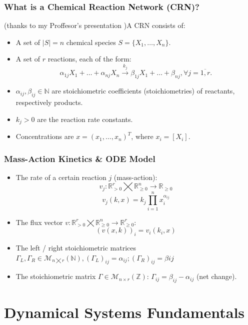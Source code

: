 \documentclass[aspectratio=169]{beamer}
\begin{document}
\begin{frame}{\insertsectionhead}
\frametitle{What is a Chemical Reaction Network (CRN)?}
(thanks to my Proffesor's presentation \cite{Parajdi2024})A CRN consists of:
\begin{itemize}
	\item A set of $\left|S\right| = n$ chemical \alert{species} $S = \{X_1, \dots, X_n\}$.
	\item A set of $r$ \alert{reactions}, each of the form:
		\[
			\alpha_{1j} X_1 + \dots + \alpha_{n j} X_n \xrightarrow{k_j} \beta_{1j} X_1 + \dots + \beta_{n j}, \forall j = \overline{1,r}.	
		\]
	\item $\alpha_{ij}, \beta_{ij} \in \mathbb{N}$ are \alert{stoichiometric coefficients} (stoichiometries) of reactants, respectively products.
	\item $k_j > 0$ are the \alert{reaction rate constants}.
	\item Concentrations are $x = (x_1, \dots, x_n)^T$, where $x_i = [X_i]$.
\end{itemize}
\end{frame}

\begin{frame}{\insertsectionhead}
\frametitle{Mass-Action Kinetics \& ODE Model}
\begin{itemize}
	\item The \alert{rate} of a certain reaction $j$ (mass-action):
		$$ 	v_j : \mathbb{R}^r_{> 0} \bigtimes \mathbb{R}^n_{\geq 0} \rightarrow \mathbb{R}_{\geq 0}   $$
		$$ v_j(k,x) = k_j \prod_{i=1}^{n} x_i^{\alpha_{ij}} $$

	\item The \alert{flux vector} $v : \mathbb{R}^r_{> 0}  \bigtimes \mathbb{R}^n_{\geq 0} \rightarrow \mathbb{R}^r_{\geq 0}$:
		$$ 	(v(x,k))_{i} = v_i(k_i, x)$$
	\item The \alert{left / right stoichiometric matrices} $		\Gamma_L, \Gamma_R \in \mathcal{M}_{n \bigtimes r}(\mathbb{N}), 		(\Gamma_L)_{ij} = \alpha_{ij};
		(\Gamma_R)_{ij} = \beta{ij} $
	\item The \alert{stoichiometric matrix} $\Gamma \in \mathcal{M}_{n \times r}(\mathbb{Z})$: $\Gamma_{ij} = \beta_{ij} - \alpha_{ij}$ (net change).

\end{itemize}
\end{frame}

\section{Dynamical Systems Fundamentals}
\end{document}
